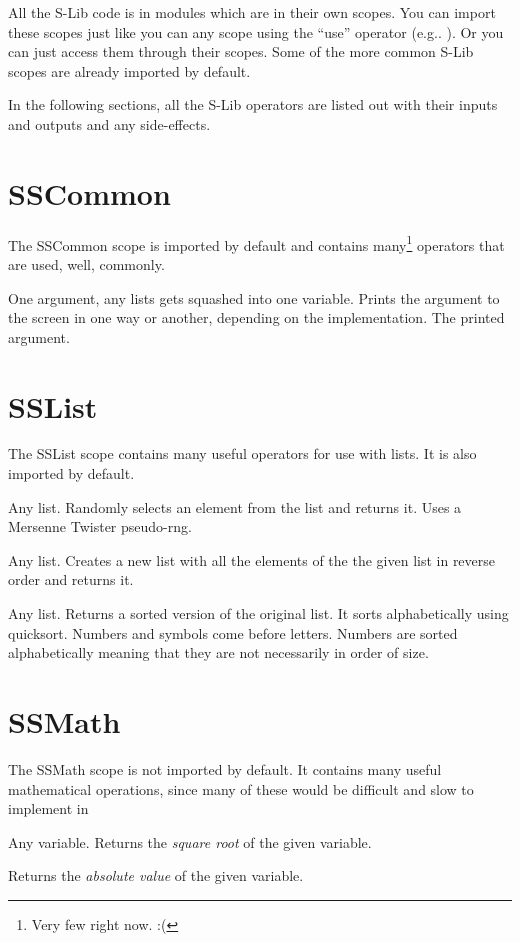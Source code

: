 All the S-Lib code is in modules which are in their own scopes.  You can import these scopes just like you can any scope using the ``use'' operator (e.g.. ).  Or you can just access them through their scopes.  Some of the more common S-Lib scopes are already imported by default.

In the following sections, all the S-Lib operators are listed out with their inputs and outputs and any side-effects.

\section{SSCommon}
The SSCommon scope is imported by default and contains many\footnote{Very few right now. :(} operators that are used, well, commonly.

{One argument, any lists gets squashed into one variable.}
{Prints the argument to the screen in one way or another, depending on the implementation.}
{The printed argument.}

\section{SSList}
The SSList scope contains many useful operators for use with lists.  It is also imported by default.

{Any list.}
{Randomly selects an element from the list and returns it.}
{Uses a Mersenne Twister pseudo-rng.}

{Any list.}
{Creates a new list with all the elements of the the given list in reverse order and returns it.}
{}

{Any list.}
{Returns a sorted version of the original list. }
{It sorts alphabetically using quicksort.  Numbers and symbols come before letters.  Numbers are sorted alphabetically meaning that they are not necessarily in order of size.}

\section{SSMath}
The SSMath scope is not imported by default.  It contains many useful mathematical operations, since many of these would be difficult and slow to implement in \SSquared{}


{Any variable.}
{Returns the \emph{square root} of the given variable.}{}

{Returns the \emph{absolute value} of the given variable.}{}

